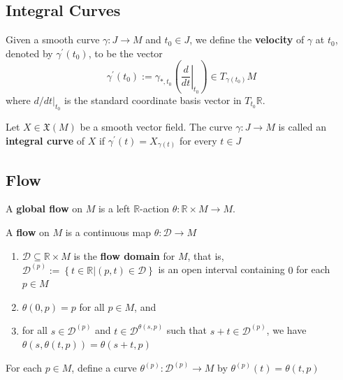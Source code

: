 \documentclass[12pt, oneside]{book}
\begin{document}
\subsection{Integral Curves}
Given a smooth curve $\gamma: J \rightarrow M$ and $t_0 \in J$, we define the \textbf{velocity} of $\gamma$ at $t_{0}$, denoted by $\gamma^{\prime}\left(t_0\right)$, to be the vector
\begin{equation*}
    \gamma^{\prime}\left(t_0\right)
    :=
    \gamma_{*,t_0}\left(\left.\frac{d}{d t}\right|_{t_0}\right) \in T_{\gamma\left(t_0\right)} M
\end{equation*}
where $d /\left.d t\right|_{t_0}$ is the standard coordinate basis vector in $T_{t_0} \mathbb{R}$.

\begin{definition}
    Let $X\in \mathfrak{X}(M)$ be a smooth vector field.
    The curve $\gamma: J \rightarrow M$ is called an \textbf{integral curve} of $X$ if $\gamma^{\prime}(t)=X_{\gamma(t)}$ for every $t \in J$
\end{definition}

\subsection{Flow}

\begin{definition}
    A \textbf{global flow} on $M$ is a left $\mathbb{R}$-action $\theta: \mathbb{R} \times M \rightarrow M$.
\end{definition}








\begin{definition}
    A \textbf{flow} on $M$ is a continuous map $\theta:\mathcal{D} \rightarrow M$
    \begin{enumerate}[label=(\roman*)]
        \item
              $\mathcal{D}\subseteq \mathbb{R} \times M$ is the \textbf{flow domain} for $M$, that is, $\mathcal{D}^{(p)}:=\left\{t\in \mathbb{R}|(p,t)\in \mathcal{D}\right\}$ is an open interval containing $0$ for each $p \in M$
        \item
              $\theta(0, p)=p$ for all $p \in M$, and
        \item
              for all $s\in \mathcal{D}^{(p)}$ and $t\in \mathcal{D}^{\theta(s,p)}$ such that $s+t\in \mathcal{D}^{(p)}$, we have $\theta\left(s, \theta(t, p)\right)=\theta(s+t, p)$

    \end{enumerate}
    \begin{remark}
        For each $p\in M$, define a curve $\theta^{(p)}: \mathcal{D}^{(p)} \rightarrow M$ by $\theta^{(p)}(t)=\theta(t, p)$
    \end{remark}
\end{definition}
\end{document}
